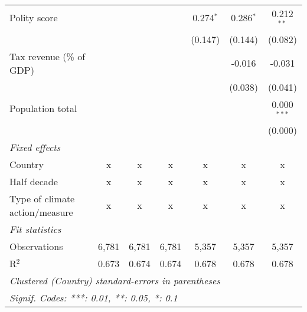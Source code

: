 \begin{tabular}{lcccccc}
   Polity score                                            &         &                &                & 0.274$^{*}$    & 0.286$^{*}$    & 0.212$^{**}$\\   
                                                           &         &                &                & (0.147)        & (0.144)        & (0.082)\\   
   Tax revenue (\% of GDP)                                 &         &                &                &                & -0.016         & -0.031\\   
                                                           &         &                &                &                & (0.038)        & (0.041)\\   
   Population total                                        &         &                &                &                &                & 0.000$^{***}$\\   
                                                           &         &                &                &                &                & (0.000)\\   
   \emph{Fixed effects}\\
   Country                                                 & x       & x              & x              & x              & x              & x\\  
   Half decade                                             & x       & x              & x              & x              & x              & x\\  
   Type of climate action/measure                          & x       & x              & x              & x              & x              & x\\  
   \midrule \emph{Fit statistics}\\
   Observations                                            & 6,781   & 6,781          & 6,781          & 5,357          & 5,357          & 5,357\\  
   R$^2$                                                   & 0.673   & 0.674          & 0.674          & 0.678          & 0.678          & 0.678\\  
   \midrule
   \multicolumn{7}{l}{\emph{Clustered (Country) standard-errors in parentheses}}\\
   \multicolumn{7}{l}{\emph{Signif. Codes: ***: 0.01, **: 0.05, *: 0.1}}\\
\end{tabular}
\par\endgroup


